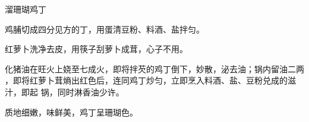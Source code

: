 \begin{recipe}{溜珊瑚鸡丁}

\ingredients


\cooking

\step 鸡脯切成四分见方的丁，用蛋清豆粉、料酒、盐拌匀。

\step 红萝卜洗净去皮，用筷子刮萝卜成茸，心子不用。

\step 化猪油在旺火上娆至七成火，即将拌芡的鸡丁倒下，妙散，泌去油；锅内留油二两
，即将红萝卜茸熵出红色后，连同鸡丁炒匀，立即烹入料酒、盐、豆粉兑成的滋汁，即起
锅，同时淋香油少许。

\notes

质地细嫩，味鲜美，鸡丁呈珊瑚色。

\end{recipe}

